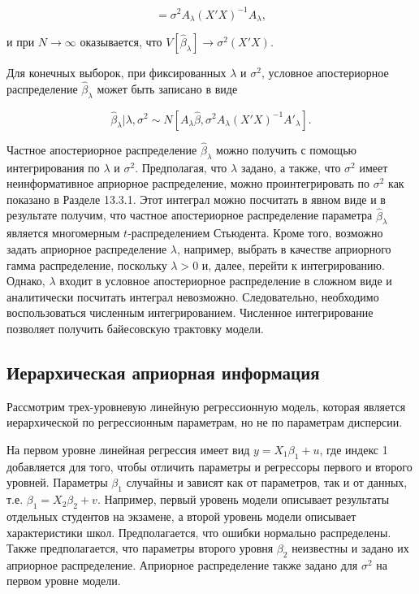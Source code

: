 \[
=\sigma^2 A_{\lambda}(X'X)^{-1}A_{\lambda},
\]

и при $N \rightarrow \infty$ оказывается, что $V[\hat{\beta}_{\lambda}] \rightarrow \sigma^{2}(X'X)$.

Для конечных выборок, при фиксированных  $\lambda$ и $\sigma^2$, условное апостериорное распределение $\hat{\beta}_{\lambda}$ может быть записано в виде

\begin{equation}
\hat{\beta}_{\lambda}|\lambda,\sigma^2\sim
N[A_{\lambda}\hat{\beta},\sigma^2 A_{\lambda}(X'X)^{-1}A'_{\lambda}].
\end{equation}

Частное апостериорное распределение $\hat{\beta}_{\lambda}$ можно получить с помощью интегрирования по $\lambda$ и $\sigma^2$. 
Предполагая, что $\lambda$ задано, а также, что $\sigma^2$ имеет неинформативное априорное распределение, можно проинтегрировать по $\sigma^2$ как показано в Разделе 13.3.1. 
Этот интеграл можно посчитать в явном виде и в результате получим, что частное  апостериорное распределение параметра $\hat{\beta}_{\lambda}$ является многомерным $t$-распределением Стьюдента. 
Кроме того, возможно задать априорное распределение $\lambda$, например, выбрать в качестве априорного  гамма распределение, поскольку $\lambda>0$ и, далее, перейти к интегрированию. Однако, $\lambda$ входит в  условное апостериорное распределение в сложном виде и аналитически посчитать интеграл невозможно. Следовательно, необходимо воспользоваться численным интегрированием. Численное интегрирование позволяет получить байесовскую трактовку модели.

\subsection{Иерархическая априорная информация}

Рассмотрим трех-уровневую линейную регрессионную модель, которая является иерархической по регрессионным параметрам, но не по параметрам дисперсии. 

На первом уровне линейная регрессия имеет вид $y=X_{1}\beta_{1}+u$, где индекс 1 добавляется для того, чтобы отличить параметры и регрессоры первого и второго уровней. Параметры $\beta_1$ случайны и зависят как от параметров, так и от данных, т.е. $\beta_1=X_{2}\beta_{2}+v$. Например, первый уровень модели описывает результаты отдельных студентов на экзамене, а второй уровень модели описывает характеристики школ. Предполагается, что ошибки нормально распределены. Также предполагается, что параметры второго уровня $\beta_2$ неизвестны и задано их  априорное распределение. Априорное распределение также задано для $\sigma^2$ на первом уровне модели.


